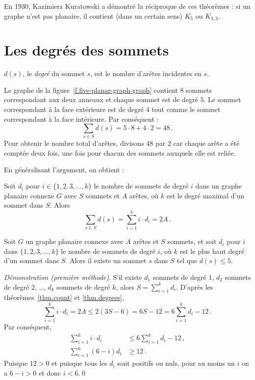 En 1930, Kazimierz Kuratowski a démontré la réciproque de ces théorèmes : si un graphe n'est pas planaire, il contient (dans un certain sens) $K_5$ ou $K_{3,3}$.

\section{Les degrés des sommets}\label{s.degrees}

\begin{definition}
$d(s)$, le \emph{degré} du sommet $s$, est le nombre d'arêtes incidentes en $s$.
\end{definition}

\begin{example}
Le graphe de la figure~\ref{f.five-planar-graph-graph} contient $8$ sommets correspondant aux deux anneaux et chaque sommet est de degré $5$. Le sommet correspondant à la face extérieure est de degré $4$ tout comme le sommet correspondant à la face intérieure. Par conséquent :
\[
\sum_{s\in S} d(s) = 5\cdot 8 + 4\cdot 2=48\,.
\]
Pour obtenir le nombre total d'arêtes, divisons 48 par $2$ car chaque arête a été comptée deux fois, une fois pour chacun des sommets auxquels elle est reliée.
\end{example}



En généralisant l'argument, on obtient :
\begin{theorem}\label{thm.degrees}
Soit $d_i$ pour $i\in \{1,2,3,\ldots,k\}$ le nombre de sommets de degré $i$ dans un graphe planaire connexe $G$ avec $S$ sommets et $A$ arêtes, où $k$ est le  degré maximal d'un sommet dans $S$. Alors 
\[
\sum_{s\in S} d(s) =\sum_{i=1}^{k} i\cdot d_i=2A\,.
\]
\end{theorem}

\begin{theorem}\label{thm.degree5}
Soit $G$ un graphe planaire connexe avec $A$ arêtes et $S$ sommets, et soit $d_i$ pour $i$ dans $\{1,2,3,\ldots,k\}$ le nombre de sommets de degré $i$, où $k$ est le plus haut degré d'un sommet dans $S$. Alors il existe un sommet $s$ dans $S$ tel que $d(s) \leq 5$.
\end{theorem}

\noindent \emph{Démonstration (première méthode)}. 
S'il existe $d_1$ sommets de degré $1$, $d_2$ sommets de degré $2$, \ldots, $d_k$ sommets de degré $k$, alors $S=\sum_{i=1}^{k}d_i$.  D'après les théorèmes~\ref{thm.count} et \ref{thm.degrees},
\[
\sum_{i=1}^{k} i\cdot d_i=2A\leq 2(3S-6) = 6S-12=6\sum_{i=1}^{k} d_i -12\,.
\]
Par conséquent,
%
\begin{align*}
\sum_{i=1}^{k} i\cdot d_i &\leq 6\sum_{i=1}^{k} d_i -12\,,\\
\sum_{i=1}^{k} (6-i)d_i&\geq 12\,.
\end{align*}
Puisque $12>0$ et puisque tous les $d_i$ sont positifs ou nuls, pour au moins un $i$ on a $6-i>0$ et donc $i<6$.\qed

